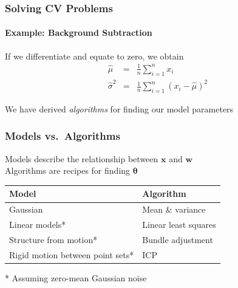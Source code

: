 \documentclass[xetex,professionalfont]{beamer}
\renewcommand{\vec}[1]{\ensuremath{\mathbf{#1}}}
\newcommand{\vw}{\vec{w}}
\newcommand{\vx}{\vec{x}}
\newcommand{\bth}{\boldsymbol{\theta}}
\begin{document}

\begin{frame}
\frametitle{Solving CV Problems}
\framesubtitle{Example: Background Subtraction}

If we differentiate and equate to zero, we obtain %
\begin{eqnarray*}
    \hat{\mu}&=&\frac{1}{n}\sum_{i=1}^n x_i \\
    \hat{\sigma}^2&=&\frac{1}{n}\sum_{i=1}^n \left(x_i-\hat{\mu}\right)^2
\end{eqnarray*}

\bigskip
We have derived \emph{algorithms} for finding our model parameters

\end{frame}


\begin{frame}[fragile]
\frametitle{Models vs.\ Algorithms}

Models describe the relationship between $\vx$ and $\vw$\\\medskip
Algorithms are recipes for finding $\bth$

\bigskip
\begin{table}
\begin{tabular}{ll} \toprule
Model & Algorithm \\ \midrule
Gaussian & Mean \& variance \\
Linear models* & Linear least squares \\ %
Structure from motion* & Bundle adjustment \\
Rigid motion between point sets* & ICP \\ \bottomrule
\end{tabular}
\end{table}
* Assuming zero-mean Gaussian noise

\end{frame}

\end{document}
